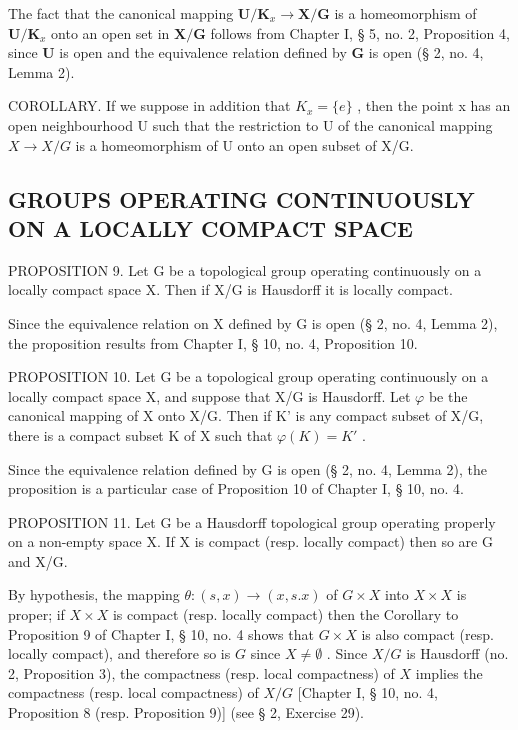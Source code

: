 The fact that the canonical mapping \(\mathbf{U} / \mathbf{K}_x\to \mathbf{X} / \mathbf{G}\) is a homeomorphism of \(\mathbf{U} / \mathbf{K}_x\) onto an open set in \(\mathbf{X} / \mathbf{G}\) follows from Chapter I, § 5, no. 2, Proposition 4, since \(\mathbf{U}\) is open and the equivalence relation defined by \(\mathbf{G}\) is open (§ 2, no. 4, Lemma 2).

COROLLARY. If we suppose in addition that \(K_{x}=\{e\}\) , then the point x has an open neighbourhood U such that the restriction to U of the canonical mapping \(X\to X/G\) is a homeomorphism of U onto an open subset of X/G.

\subsection{GROUPS OPERATING CONTINUOUSLY ON A LOCALLY COMPACT SPACE}

PROPOSITION 9. Let G be a topological group operating continuously on a locally compact space X. Then if X/G is Hausdorff it is locally compact.

Since the equivalence relation on X defined by G is open (§ 2, no. 4, Lemma 2), the proposition results from Chapter I, § 10, no. 4, Proposition 10.

PROPOSITION 10. Let G be a topological group operating continuously on a locally compact space X, and suppose that X/G is Hausdorff. Let \(\varphi\) be the canonical mapping of X onto X/G. Then if K' is any compact subset of X/G, there is a compact subset K of X such that \(\varphi(K) = K'\) .

Since the equivalence relation defined by G is open (§ 2, no. 4, Lemma 2), the proposition is a particular case of Proposition 10 of Chapter I, § 10, no. 4.

PROPOSITION 11. Let G be a Hausdorff topological group operating properly on a non-empty space X. If X is compact (resp. locally compact) then so are G and X/G.

By hypothesis, the mapping \(\theta : (s, x) \to (x, s.x)\) of \(G \times X\) into \(X \times X\) is proper; if \(X \times X\) is compact (resp. locally compact) then the Corollary to Proposition 9 of Chapter I, § 10, no. 4 shows that \(G \times X\) is also compact (resp. locally compact), and therefore so is \(G\) since \(X \neq \emptyset\) . Since \(X/G\) is Hausdorff (no. 2, Proposition 3), the compactness (resp. local compactness) of \(X\) implies the compactness (resp. local compactness) of \(X/G\) {[}Chapter I, § 10, no. 4, Proposition 8 (resp. Proposition 9){]} (see § 2, Exercise 29).

